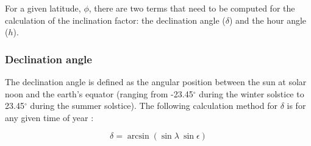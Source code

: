For a given latitude, $\phi$, there are two terms that need to be computed for the calculation of the inclination factor: the declination angle ($\delta$) and the hour angle ($h$).

\subsubsection{Declination angle}
\label{sec:delta}
The declination angle is defined as the angular position between the sun at solar noon and the earth's equator (ranging from -23.45$^{\circ}$ during the winter solstice to 23.45$^{\circ}$ during the summer solstice). 
The following calculation method for $\delta$ is for any given time of year \parencite{woolf68, loutre03}:

\begin{equation}
\label{eq:delta}
    \delta = \arcsin\left(\sin\lambda\:\sin\epsilon\right)
\end{equation}

